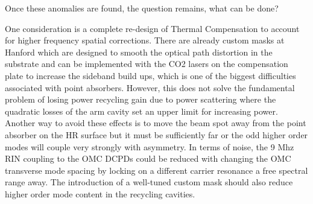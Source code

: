 	 \indent Once these anomalies are found, the question remains, what can be done?
	 
	 One consideration is a complete re-design of Thermal Compensation to account for higher frequency spatial corrections. There are already custom masks at Hanford which are designed to smooth the optical path distortion in the substrate and can be implemented with the CO2 lasers on the compensation plate to increase the sideband build ups, which is one of the biggest difficulties associated with point absorbers.  However, this does not solve the fundamental problem of losing power recycling gain due to power scattering where the quadratic losses of the arm cavity set an upper limit for increasing power.  Another way to avoid these effects is to move the beam spot away from the point absorber on the HR surface but it must be sufficiently far or the odd higher order modes will couple very strongly with asymmetry. In terms of noise, the 9 Mhz RIN coupling to the OMC DCPDs could be reduced with changing the OMC transverse mode spacing by locking on a different carrier resonance a free spectral range away.  The introduction of a well-tuned custom mask should also reduce higher order mode content in the recycling cavities.
	 
